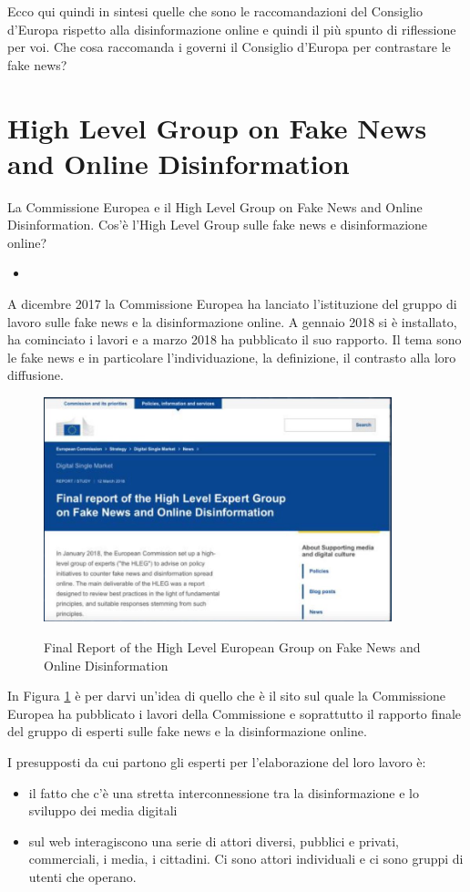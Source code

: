 Ecco qui quindi in sintesi quelle che sono le raccomandazioni del Consiglio d'Europa rispetto alla disinformazione online e quindi il più spunto di riflessione per voi. Che cosa raccomanda i governi il Consiglio d'Europa per contrastare le fake news? 

\section{High Level Group on Fake News and Online Disinformation}
La Commissione Europea e il High Level Group on Fake News and Online Disinformation. Cos'è l'High Level Group sulle fake news e disinformazione online? 
\begin{itemize}
    \item 
\end{itemize}

A dicembre 2017 la Commissione Europea ha lanciato l'istituzione del gruppo di lavoro sulle fake news e la disinformazione online.
A gennaio 2018 si è installato, ha cominciato i lavori e a marzo 2018 ha pubblicato il suo rapporto. 
Il tema sono le fake news e in particolare l'individuazione, la definizione, il contrasto alla loro diffusione.

\begin{figure}[h]
\centering
\includegraphics[width=0.9\textwidth]{images/11_lez_fig_02.jpg}
\label{fig: High Level European Group}
\caption{Final Report of the High Level European Group on Fake News and Online Disinformation}
\end{figure}

In Figura \ref{fig: High Level European Group} è per darvi un'idea di quello che è il sito sul quale la Commissione Europea ha pubblicato i lavori della Commissione e soprattutto il rapporto finale del gruppo di esperti sulle fake news e la disinformazione online. \par
I presupposti da cui partono gli esperti per l'elaborazione del loro lavoro è:
\begin{itemize}
    \item il fatto che c'è una stretta interconnessione tra la disinformazione e lo sviluppo dei media digitali
    \item sul web interagiscono una serie di attori diversi, pubblici e privati, commerciali, i media, i cittadini. Ci sono attori individuali e ci sono gruppi di utenti che operano.
\end{itemize}

